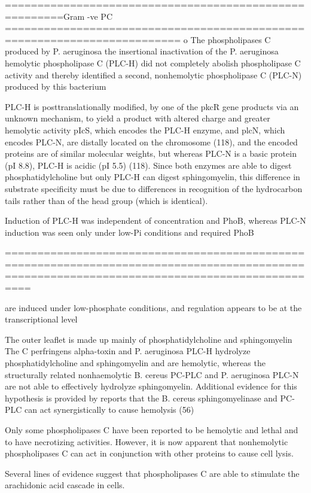 =======================================================Gram -ve PC =========================================================================
o The phospholipases C produced by P. aeruginosa 
 the insertional inactivation of the P. aeruginosa hemolytic phospholipase C (PLC-H) did not completely abolish phospholipase C activity and thereby identified a second, nonhemolytic phospholipase C (PLC-N) produced by this bacterium

 PLC-H is posttranslationally modified, by one of the pkcR gene products via an unknown mechanism, to yield a product with altered charge and greater hemolytic activity
  pIcS, which encodes the PLC-H enzyme, and plcN, which encodes PLC-N, are distally located on the chromosome (118), and the encoded proteins are of similar molecular weights, but whereas PLC-N is a basic protein (pI 8.8), PLC-H is acidic (pI 5.5) (118). 
  Since both enzymes are able to digest phosphatidylcholine but only PLC-H can digest sphingomyelin, this difference in substrate specificity must be due to differences in recognition of the hydrocarbon tails rather than of the head group (which is identical).

 Induction of PLC-H was independent of concentration and PhoB, whereas PLC-N induction was seen only under low-Pi conditions and required PhoB 

 ==============================================================================================================================================

  are induced under low-phosphate conditions, and regulation appears to be at the transcriptional level 

 The outer leaflet is made up mainly of phosphatidylcholine and sphingomyelin 
  The C perfringens alpha-toxin and P. aeruginosa PLC-H hydrolyze phosphatidylcholine and sphingomyelin and are hemolytic, whereas the structurally related nonhaemolytic B. cereus PC-PLC and P. aeruginosa PLC-N are not able to effectively hydrolyze sphingomyelin. Additional evidence for this hypothesis is provided by reports that the B. cereus sphingomyelinase and PC-PLC can act synergistically to cause hemolysis (56)

 Only some phospholipases C have been reported to be hemolytic and lethal and to have necrotizing activities. However, it is now apparent that nonhemolytic phospholipases C can act in conjunction with other proteins to cause cell lysis. 

Several lines of evidence suggest that phospholipases C are able to stimulate the arachidonic acid cascade in cells.

